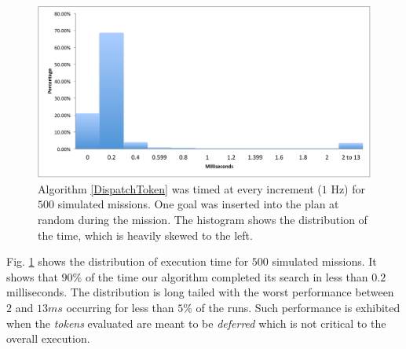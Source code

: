 \begin{figure}[!b]
  \centering
  \includegraphics[width=\columnwidth]{figs/HistogramAlg1}
  \caption{\small Algorithm \ref{DispatchToken} was timed at every
    increment ($1$ Hz) for $500$ simulated missions. One goal was
    inserted into the plan at random during the mission. The histogram
    shows the distribution of the time, which is heavily skewed to the
    left.}
  \label{fig:histogram}
\end{figure}

Fig. \ref{fig:histogram} shows the distribution of execution time for
$500$ simulated missions. It shows that $90\%$ of the time our
algorithm completed its search in less than $0.2$ milliseconds. The
distribution is long tailed with the worst performance between $2$ and
$13ms$ occurring for less than $5\%$ of the runs. Such performance is
exhibited when the {\em tokens} evaluated are meant to be {\em
  deferred} which is not critical to the overall execution.




